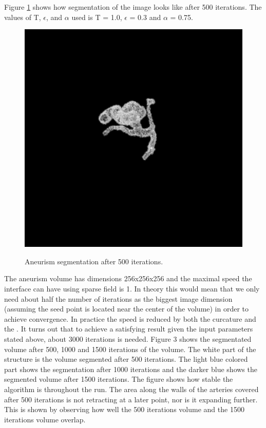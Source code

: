 Figure \ref{aneurism_500_iterations} shows how segmentation of the image looks like after 500 iterations. The values of T, $\epsilon$, and $\alpha$ used is T = 1.0, $\epsilon$ = 0.3 and $\alpha$ = 0.75. 
\begin{figure}[h!]
\centering
\includegraphics[width=.9\textwidth]{results/3D/aneurism_500_iterations}
\label{aneurism_500_iterations}
\caption{Aneurism segmentation after 500 iterations.}
\end{figure}
The aneurism volume has dimensions 256x256x256 and the maximal speed the interface can have using sparse field is 1. In theory this would mean that we only need about half the number of iterations as the biggest image dimension (assuming the seed point is located near the center of the volume) in order to achieve convergence. In practice the speed is reduced by both the curcature and the . It turns out that to achieve a satisfying result given the input parameters stated above, about 3000 iterations is needed. Figure 3 shows the segmentated volume after 500, 1000 and 1500 iterations of the volume. The white part of the structure is the volume segmented after 500 iterations. The light blue colored part shows the segmentation after 1000 iterations and the darker blue shows the segmented volume after 1500 iterations. The figure shows how stable the algorithm is throughout the run. The area along the walls of the arteries covered after 500 iterations is not retracting at a later point, nor is it expanding further. This is shown by observing how well the 500 iterations volume and the 1500 iterations volume overlap.

